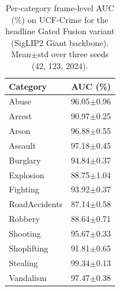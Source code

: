 \begin{table}[t]
\centering
\caption{Per-category frame-level AUC (\%) on UCF-Crime for the headline Gated Fusion variant (SigLIP2 Giant backbone). Mean$\pm$std over three seeds (42, 123, 2024).}
\label{tab:percat-ucf}
\begin{tabular}{lr}
\toprule
Category & AUC (\%) \\
\midrule
Abuse & 96.05$\pm$0.96 \\
Arrest & 90.97$\pm$0.25 \\
Arson & 96.88$\pm$0.55 \\
Assault & 97.18$\pm$0.45 \\
Burglary & 94.84$\pm$0.37 \\
Explosion & 88.75$\pm$1.04 \\
Fighting & 93.92$\pm$0.37 \\
RoadAccidents & 87.14$\pm$0.58 \\
Robbery & 88.64$\pm$0.71 \\
Shooting & 95.67$\pm$0.33 \\
Shoplifting & 91.81$\pm$0.65 \\
Stealing & 99.34$\pm$0.13 \\
Vandalism & 97.47$\pm$0.38 \\
\bottomrule
\end{tabular}
\end{table}
